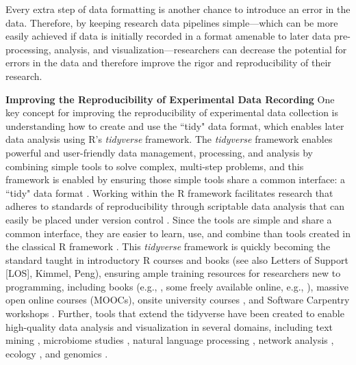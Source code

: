 \documentclass[pdftex,english,11pt,parskip=half]{scrartcl}
\begin{document}
Every extra step of data formatting is another chance to introduce an error in the data. Therefore, by keeping research data pipelines simple---which can be more easily achieved if data is initially recorded in a format amenable to later data pre-processing, analysis, and visualization---researchers can decrease the potential for errors in the data and therefore improve the rigor and reproducibility of their research.

\textbf{Improving the Reproducibility of Experimental Data Recording} One key concept for improving the reproducibility of experimental data collection is understanding how to create and use the ``tidy" data format, which enables later data analysis using R's \textit{tidyverse} framework. The \textit{tidyverse} framework enables powerful and user-friendly data management, processing, and analysis by combining simple tools to solve complex, multi-step problems, and this framework is enabled by ensuring those simple tools share a common interface: a ``tidy" data format \cite{ross2017declutter, silge2016tidytext, wickham2016ggplot2, wickham2016r}. Working within the R framework facilitates research that adheres to standards of reproducibility through scriptable data analysis that can easily be placed under version control \cite{bryan2017excuse}. Since the tools are simple and share a common interface, they are easier to learn, use, and combine than tools created in the classical R framework \cite{ross2017declutter, lowndes2017our, reviewer2017review, mcnamara2016state}. This \textit{tidyverse} framework is quickly becoming the standard taught in introductory R courses and books \cite{hicks2017guide, baumer2015data, kaplan2017teaching, stander2017enthusing, reviewer2017review, mcnamara2016state} (see also Letters of Support [LOS], Kimmel, Peng), ensuring ample training resources for researchers new to programming, including books (e.g., \cite{baumer2017modern, lifesciencesR}, some freely available online, e.g., \cite{wickham2016r}), massive open online courses (MOOCs), onsite university courses \cite{baumer2015data, kaplan2017teaching, stander2017enthusing}, and Software Carpentry workshops \cite{wilson2014software, pawlik2017developing}. Further, tools that extend the tidyverse have been created to enable high-quality data analysis and visualization in several domains, including text mining \cite{silge2017text}, microbiome studies \cite{mcmurdie2013phyloseq}, natural language processing \cite{RJ-2017-035}, network analysis \cite{RJ-2017-023}, ecology \cite{hsieh2016inext}, and genomics \cite{yin2012ggbio}.
\end{document}
